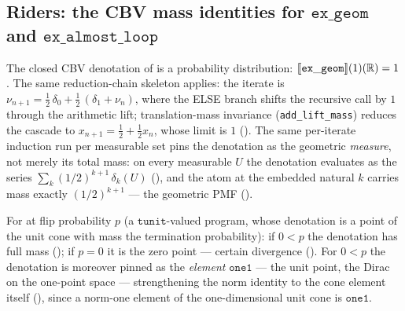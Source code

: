 \subsection{Riders: the CBV mass identities for
\texorpdfstring{$\mathtt{ex\_geom}$}{ex\_geom} and
\texorpdfstring{$\mathtt{ex\_almost\_loop}$}{ex\_almost\_loop}}%
\label{ssec:cbv-riders}

\begin{theorem}%
\label{thm:cbv-ex-geom}
\rocqok
{}
The closed CBV denotation of
 is a probability
distribution:
$[\![ \mathtt{ex\_geom} ]\!](1)(\mathbb{R}) = 1$. The same
reduction-chain skeleton applies: the iterate is
$\nu_{n+1} = \tfrac12\,\delta_0 + \tfrac12\,(\delta_1 + \nu_n)$,
where the ELSE branch shifts the recursive call by $1$ through the
arithmetic lift; translation-mass invariance
(\texttt{add\_lift\_mass}) reduces the cascade to
$x_{n+1} = \tfrac12 + \tfrac12 x_n$, whose limit is $1$
().
The same per-iterate induction run per measurable set pins the
denotation as the geometric \emph{measure}, not merely its total
mass: on every measurable $U$ the denotation evaluates as the series
$\sum_k (1/2)^{k+1}\,\delta_{k}(U)$
(\rocqok),
and the atom at the embedded natural $k$ carries mass exactly
$(1/2)^{k+1}$ --- the geometric PMF
(\rocqok).
\end{theorem}

\begin{theorem}%
\label{thm:cbv-ex-almost-loop}
\rocqok
{}\rocqok
{}
For  at flip probability
$p$ (a $\mathtt{tunit}$-valued program, whose denotation is a point of
the unit cone with mass the termination probability): if $0 < p$ the
denotation has full mass
();
if $p = 0$ it is the zero point --- certain divergence
().
For $0 < p$ the denotation is moreover pinned as the \emph{element}
$\mathtt{one1}$ --- the unit point, the Dirac on the one-point space ---
strengthening the norm identity to the cone element itself
(\rocqok),
since a norm-one element of the one-dimensional unit cone is
$\mathtt{one1}$.
\end{theorem}


